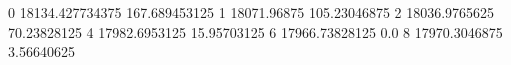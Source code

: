 0 18134.427734375 167.689453125
1 18071.96875 105.23046875
2 18036.9765625 70.23828125
4 17982.6953125 15.95703125
6 17966.73828125 0.0
8 17970.3046875 3.56640625
